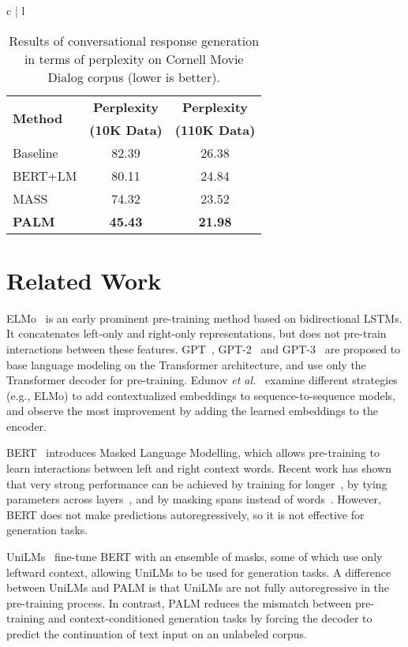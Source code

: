 \documentclass[11pt,a4paper]{article}
\newcommand{\method}{PALM\xspace}
\begin{document}
\begin{table*}[t]
\begin{tabular}{ c | l }
\begin{table}[t]
\center
\begin{tabular}{ l | c | c }
\hline\hline
\multirow{2}{*}{\textbf{Method}} & \textbf{Perplexity} & \textbf{Perplexity}\\
& \textbf{(10K Data)} & \textbf{(110K Data)}\\
\hline\hline
Baseline & 82.39 & 26.38\\
\hline
BERT+LM & 80.11 & 24.84\\
\hline
MASS & 74.32 & 23.52\\
\hline
\textbf{\method} & \textbf{45.43} & \textbf{21.98}\\
\hline\hline
\end{tabular}
\caption{Results of conversational response generation in terms of perplexity on Cornell Movie Dialog corpus (lower is better).}
\label{table:response}
\vspace{-10pt}
\end{table}

\vspace{-5pt}
\section{Related Work}
\vspace{-5pt}
ELMo~\cite{peters-etal-2018-deep} is an early prominent pre-training method based on bidirectional LSTMs. It concatenates left-only and right-only representations, but does not pre-train interactions between these features. GPT~\cite{Radford2018ImprovingLU}, GPT-2~\cite{gpt2} and GPT-3~\cite{gpt3} are proposed to base language modeling on the Transformer architecture, and use only the Transformer decoder for pre-training. Edunov \emph{et al.}~\cite{Edunov:2019} examine different strategies (e.g., ELMo) to add contextualized embeddings to sequence-to-sequence models, and observe the most improvement by adding the learned embeddings to the encoder.

BERT~\cite{bert2018jacob} introduces Masked Language Modelling, which allows pre-training to learn interactions between left and right context words. Recent work has shown that very strong performance can be achieved by training for longer~\cite{roberta2019}, by tying parameters across layers~\cite{albert2019}, and by masking spans instead of words~\cite{spanbert2019}. However, BERT does not make predictions autoregressively, so it is not effective for generation tasks.

UniLMs~\cite{unilm2019,unilmv2} fine-tune BERT with an ensemble of masks, some of which use only leftward context, allowing UniLMs to be used for generation tasks. A difference between UniLMs and \method is that UniLMs are not fully autoregressive in the pre-training process. In contrast, \method reduces the mismatch between pre-training and context-conditioned generation tasks by forcing the decoder to predict the continuation of text input on an unlabeled corpus.


\end{tabular}
\end{table*}
\end{document}
